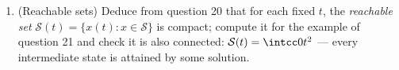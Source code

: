 \begin{problem}[{Weekend problem --- existence of solutions of
$x' = f(t, x)$ without Lipschitz}]
\begin{enumerate}[resume]
        $x_\infty \equiv 0$ \emph{(for any solution, let $c =
        \sup\{t : x(t) = 0\}$ and integrate $(\sqrt x)' = 1$ on
        $\{x > 0\}$)}, that $c \mapsto x_c$ is continuous from
        $\intcc0\infty$ (one-point compactification, i.e.\
        $c = \infty$ glued as limit) to $\mathcal C([0,1])$,
        and conclude that $\mathcal S$ is indeed compact and
        connected --- a segment-shaped funnel.
  \item (Reachable sets) Deduce from question 20 that for each
        fixed $t$, the \emph{reachable set} $\mathcal S(t) =
        \{x(t) : x \in \mathcal S\}$ is compact; compute it for
        the example of question 21 and check it is also
        connected: $\mathcal S(t) = \intcc0{t^2}$ --- every
        intermediate state is attained by some solution.
\end{enumerate}


\end{problem}
